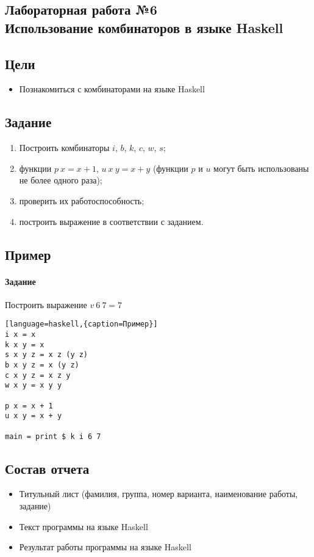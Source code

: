 \documentclass[a4paper,12pt]{article}
\begin{document}
\newpage
\subsection{Лабораторная работа №6 \\ Использование комбинаторов в языке Haskell}
\subsection{Цели}
\begin{itemize}
	\item Познакомиться с комбинаторами на языке Haskell
\end{itemize}

\subsection{Задание}
\begin{enumerate}
	\item Построить комбинаторы $i$, $b$, $k$, $c$, $w$, $s$;
	\item функции $p\ x = x + 1$, $u\ x\ y = x + y$ (функции $p$ и $u$ могут быть использованы не более одного раза);
	\item проверить их работоспособность;
	\item построить выражение в соответствии с заданием.
\end{enumerate}

\subsection{Пример}
\paragraph{Задание}

Построить выражение 
$v\ 6\ 7 = 7$

\begin{lstlisting}[language=haskell,{caption=Пример}]
i x = x
k x y = x
s x y z = x z (y z)
b x y z = x (y z)
c x y z = x z y
w x y = x y y

p x = x + 1
u x y = x + y

main = print $ k i 6 7
\end{lstlisting}

\subsection{Состав отчета}
\begin{itemize}
	\item Титульный лист (фамилия, группа, номер варианта, наименование работы, задание)
	\item Текст программы на языке Haskell
	\item Результат работы программы на языке Haskell
\end{itemize}
\end{document}
